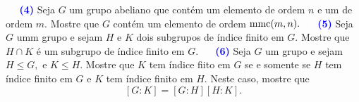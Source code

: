 \documentclass[12pt, a4paper]{article}
\newcommand{\mmc}{{\rm mmc}}
\begin{document}
\textcolor{white}{Oi}\newline\newline
\textcolor{blue}{\bf(4)}\label{36} Seja $G$ um grupo abeliano que contém um elemento de ordem $n$ e um de ordem $m.$ Mostre que $G$ contém um elemento de ordem $\mmc(m,n).$
\textcolor{white}{Oi}\newline\newline
\textcolor{blue}{\bf(5)}\label{37} Seja $G$ umm grupo e sejam $H$ e $K$ dois subgrupos de índice finito em $G.$ Mostre que $H \cap K$ é um subgrupo de índice finito em $G.$
\textcolor{white}{Oi}\newline\newline
\textcolor{blue}{\bf(6)}\label{38} Seja $G$ um grupo e sejam $H \le G,$ e $K \le H.$ Mostre que $K$ tem índice fiito em $G$ se e somente se $H$ tem índice finito em $G$ e $K$ tem índice finito em $H.$ Neste caso, mostre que \[[G:K] = [G : H][H : K].\]
\newpage
\end{document}
